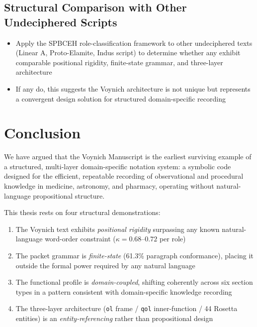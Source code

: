 \documentclass[11pt,a4paper,twocolumn]{article}
\begin{document}
\subsection{Structural Comparison with Other Undeciphered Scripts}

\begin{itemize}[leftmargin=*,itemsep=2pt]
    \item Apply the SPBCEH role-classification framework to other undeciphered texts (Linear A, Proto-Elamite, Indus script) to determine whether any exhibit comparable positional rigidity, finite-state grammar, and three-layer architecture
    \item If any do, this suggests the Voynich architecture is not unique but represents a convergent design solution for structured domain-specific recording
\end{itemize}

\section{Conclusion}
\label{sec:conclusion}

We have argued that the Voynich Manuscript is the earliest surviving example of a structured, multi-layer domain-specific notation system: a symbolic code designed for the efficient, repeatable recording of observational and procedural knowledge in medicine, astronomy, and pharmacy, operating without natural-language propositional structure.

This thesis rests on four structural demonstrations:

\begin{enumerate}[leftmargin=*,itemsep=2pt]
    \item The Voynich text exhibits \textit{positional rigidity} surpassing any known natural-language word-order constraint ($\kappa = 0.68$--$0.72$ per role)
    \item The packet grammar is \textit{finite-state} (61.3\% paragraph conformance), placing it outside the formal power required by any natural language
    \item The functional profile is \textit{domain-coupled}, shifting coherently across six section types in a pattern consistent with domain-specific knowledge recording
    \item The three-layer architecture (\texttt{ol} frame / \texttt{qol} inner-function / 44 Rosetta entities) is an \textit{entity-referencing} rather than propositional design
\end{enumerate}
\end{document}
